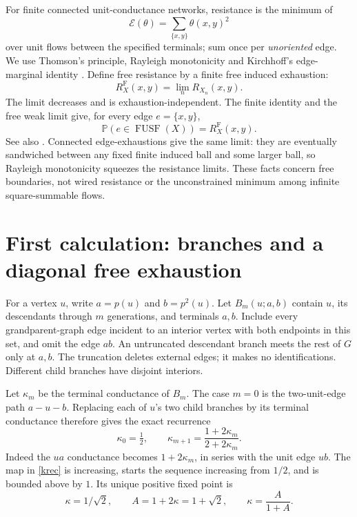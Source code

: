 \documentclass[11pt]{article}
\theoremstyle{remark}\newtheorem{remark}[theorem]{Remark}
\newcommand{\FUSF}{\operatorname{FUSF}}
\newcommand{\RF}{R^{\mathrm F}}
\newcommand{\energy}{\mathcal E}
\begin{document}
For finite connected unit-conductance networks, resistance is the minimum
of
\[
 \energy(\theta)=\sum_{\{x,y\}}\theta(x,y)^2
\]
over unit flows between the specified terminals; sum once per
\emph{unoriented} edge. We use Thomson's principle, Rayleigh monotonicity
and Kirchhoff's edge-marginal identity \cite[\S4, Theorem~4.1]{BLPS}.
Define free resistance by a finite free induced exhaustion:
\[
 \RF_X(x,y)=\lim_n R_{X_n}(x,y).
\]
The limit decreases and is exhaustion-independent. The finite identity
and the free weak limit give, for every edge \(e=\{x,y\}\),
\begin{equation}\label{marginal}
 \mathbb P(e\in\FUSF(X))=\RF_X(x,y).
\end{equation}
See also \cite[Proposition~7.1 and Theorem~7.8]{BLPS}.
Connected edge-exhaustions give the same limit: they are eventually
sandwiched between any fixed finite induced ball and some larger ball,
so Rayleigh monotonicity squeezes the resistance limits.
These facts concern free boundaries, not wired resistance or the
unconstrained minimum among infinite square-summable flows.

\section{First calculation: branches and a diagonal free exhaustion}
For a vertex \(u\), write \(a=p(u)\) and \(b=p^2(u)\).
Let \(B_m(u;a,b)\) contain \(u\), its descendants through \(m\) generations,
and terminals \(a,b\). Include every grandparent-graph edge incident to
an interior vertex with both endpoints in this set, and omit the edge
\(ab\). An untruncated descendant branch meets the rest of \(G\) only at
\(a,b\). The truncation deletes external edges; it makes no identifications.
Different child branches have disjoint interiors.

Let \(\kappa_m\) be the terminal conductance of \(B_m\).
The case \(m=0\) is the two-unit-edge path \(a-u-b\).
Replacing each of \(u\)'s two child branches by its terminal conductance
therefore gives the exact recurrence
\begin{equation}\label{krec}
 \kappa_0=\tfrac12,\qquad
 \kappa_{m+1}=\frac{1+2\kappa_m}{2+2\kappa_m}.
\end{equation}
Indeed the \(u a\) conductance becomes \(1+2\kappa_m\), in series
with the unit edge \(u b\). The map in \eqref{krec} is increasing,
starts the sequence increasing from \(1/2\), and is bounded above by \(1\).
Its unique positive fixed point is
\[
 \kappa=1/\sqrt2,\qquad A=1+2\kappa=1+\sqrt2,\qquad
 \kappa=\frac{A}{1+A}.
\]
\end{document}
